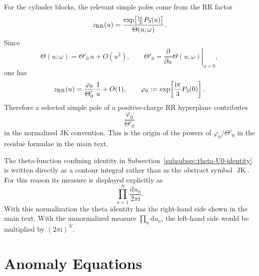 \documentclass[11pt,a4paper]{article}
\numberwithin{equation}{section}
\theoremstyle{plain}
\theoremstyle{definition}
\theoremstyle{remark}
\newcommand{\ii}{\mathrm{i}}
\newcommand{\dd}{\mathrm{d}}
\begin{document}
For the cylinder blocks, the relevant simple poles come from the RR factor
\begin{equation}
z_{\rm RR}(u)
=
\frac{\exp\!\left[\frac{\ii\pi}{3}P_3(u)\right]}{\Theta(u;\omega)} .
\label{eq:JK-RR-block-reminder}
\end{equation}
Since
\begin{equation}
\Theta(u;\omega)=\Theta'_0\,u+O(u^2),
\qquad
\Theta'_0=\left.\frac{\partial}{\partial u}\Theta(u;\omega)\right|_{u=0},
\label{eq:JK-theta-local-expansion}
\end{equation}
one has
\begin{equation}
z_{\rm RR}(u)
=
\frac{\varphi_0}{\Theta'_0}\,\frac{1}{u}+O(1),
\qquad
\varphi_0:=
\exp\!\left[\frac{\ii\pi}{3}P_3(0)\right].
\label{eq:JK-simple-RR-pole}
\end{equation}
Therefore a selected simple pole of a positive-charge RR hyperplane contributes
\begin{equation}
\frac{\varphi_0}{\Theta'_0}
\label{eq:JK-RR-simple-factor}
\end{equation}
in the normalized JK convention.  This is the origin of the powers of \(\varphi_0/\Theta'_0\) in the residue formulae in the main text.

The theta-function confining identity in Subsection~\ref{subsubsec:theta-U0-identity} is written directly as a contour integral rather than as the abstract symbol \(\operatorname{JK}\).  For this reason its measure is displayed explicitly as
\begin{equation}
\prod_{a=1}^{N}\frac{\dd u_a}{2\pi\ii} .
\label{eq:JK-confining-measure-reminder}
\end{equation}
With this normalization the theta identity has the right-hand side shown in the main text.  With the unnormalized measure \(\prod_a\dd u_a\), the left-hand side would be multiplied by \((2\pi\ii)^N\).


\section{Anomaly Equations}\label{app:anomalies}
\end{document}
